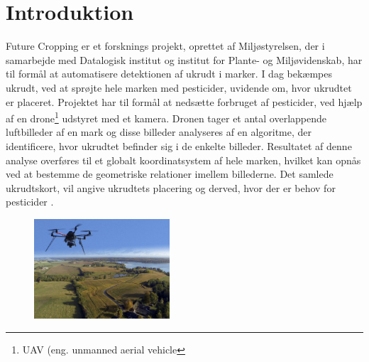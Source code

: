\chapter{Introduktion} \label{sec:intro}
Future Cropping er et forsknings projekt, oprettet af Miljøstyrelsen, der i samarbejde med Datalogisk institut og institut for Plante- og Miljøvidenskab, har til formål at automatisere detektionen af ukrudt i marker. I dag bekæmpes ukrudt, ved at sprøjte hele marken med pesticider, uvidende om, hvor ukrudtet er placeret. Projektet har til formål at nedsætte forbruget af pesticider, ved hjælp af en drone\footnote{UAV (eng. unmanned aerial vehicle} udstyret med et kamera. Dronen tager et antal overlappende luftbilleder af en mark og disse billeder analyseres af en algoritme, der identificere, hvor ukrudtet befinder sig i de enkelte billeder. Resultatet af denne analyse overføres til et globalt koordinatsystem af hele marken, hvilket kan opnås ved at bestemme de geometriske relationer imellem billederne. Det samlede ukrudtskort, vil angive ukrudtets placering og derved, hvor der er behov for pesticider \cite{drone}.
\begin{figure}[H]
    \centering
    \includegraphics[width=0.45\textwidth]{fig/drone4.jpg}
     \vspace{-0.5em}
    \begin{center}    
       \caption{\textcolor{gray}{\footnotesize \textit{ }}}
    \label{fig:difference}
     \end{center}
     \vspace{-3em}
  \end{figure} \noindent

